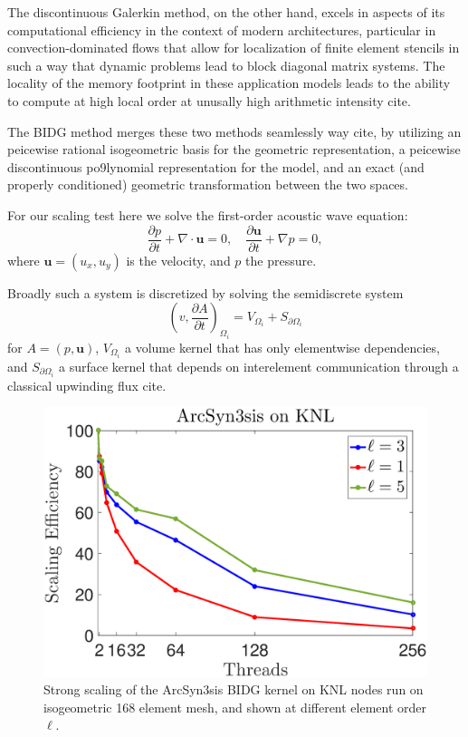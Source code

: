 The discontinuous Galerkin method, on the other hand, excels in aspects of its computational efficiency in the context of modern architectures, particular in convection-dominated flows that allow for localization of finite element stencils in such a way that dynamic problems lead to block diagonal matrix systems.  The locality of the memory footprint in these application models leads to the ability to compute at high local order at unusally high arithmetic intensity cite.

The BIDG method merges these two methods seamlessly way cite, by utilizing an peicewise rational isogeometric basis for the geometric representation, a peicewise discontinuous po9lynomial representation for the model, and an exact (and properly conditioned) geometric transformation between the two spaces.

For our scaling test here we solve the first-order acoustic wave equation: \begin{equation} \label{awe} \frac{\partial p}{\partial t} + \nabla\cdot \boldsymbol{u} = 0, \quad  \frac{\partial\boldsymbol{u}}{\partial t} + \nabla p = 0, \end{equation} where $\boldsymbol{u}=(u_x,u_y)$ is the velocity, and $p$ the pressure.

Broadly such a system is discretized by solving the semidiscrete system \[ \left( v, \frac{ \partial A}{\partial t} \right)_{\Omega_{i}}= V_{\Omega_{i}}+S_{\partial\Omega_{i}} \] for $A = (p,\boldsymbol{u})$, $V_{\Omega_{i}}$ a volume kernel that has only elementwise dependencies, and $S_{\partial\Omega_{i}}$ a surface kernel that depends on interelement communication through a classical upwinding flux cite.  


\begin{figure}[h]
\begin{center}
\includegraphics[width=0.95\linewidth]{./bidg_data/scaling_p}
\end{center}
\vspace*{-.5cm}
\caption{Strong scaling of the ArcSyn3sis BIDG kernel on KNL nodes run on isogeometric 168 element mesh, and shown at different element order $\ell$.}
\label{fig:dns_scaling}
\end{figure}


